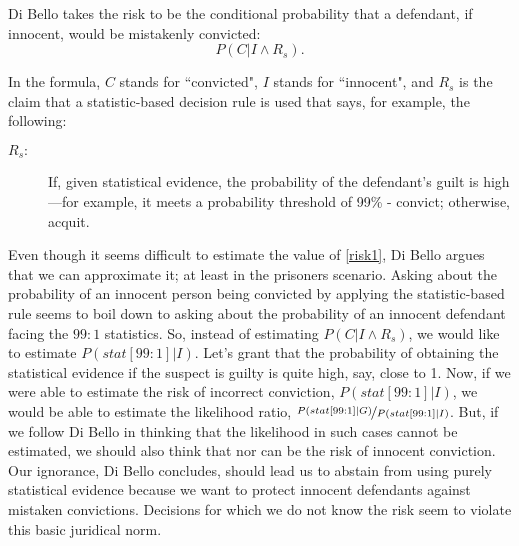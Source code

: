 \documentclass{article}
\begin{document}
 Di Bello takes the risk to be the conditional probability that a defendant, if innocent, would be mistakenly convicted: 
\begin{equation}\label{risk1}
P(C\vert I\wedge R_{s}).
\end{equation}	

\noindent In the formula, $C$ stands for ``convicted", $I$ stands for ``innocent", and $R_{s}$ is the claim that  a statistic-based decision rule is used that says, for example, the following: 

\begin{description}
	
\item[$R_{s}:$] If, given statistical evidence, the probability of the defendant’s guilt is high—for example, it meets a probability threshold of 99\% - convict; otherwise, acquit. 

\end{description}

Even though it seems difficult to estimate the value of \eqref{risk1}, Di Bello argues that we can approximate it; at least in the prisoners scenario. Asking about the probability of an innocent person being convicted by applying the statistic-based rule seems to boil down  to asking about the probability of an innocent defendant facing the $99:1$ statistics. So, instead of estimating $P(C\vert I\wedge R_{s})$, we would like to  estimate $P(stat[99:1]\vert I)$.  
Let's grant  that the probability of obtaining the statistical evidence if the suspect is guilty is quite high, say, close to 1. Now, if we were able to estimate the risk of incorrect conviction, $P(stat[99:1]\vert I)$, we would be able to estimate the likelihood ratio, $\nicefrac{P(stat[99:1]\vert G)}{P(stat[99:1]\vert I)}$. But, if we follow Di Bello in thinking that the likelihood in such cases cannot be estimated, we should also think that nor can be the risk of innocent conviction.  Our ignorance, Di Bello concludes, should lead us to abstain from using purely statistical evidence because we want to protect innocent defendants against mistaken convictions. Decisions for which we do not know the risk seem to violate this basic juridical norm. 
\end{document}
